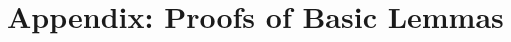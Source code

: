 \documentclass{article}
\newcommand{\tth}{\theta}
\newcommand{\bb}[1]{\mathbf{#1}}
\newcommand{\fl}{\mathrm{fl}}
\theoremstyle{definition}
\begin{document}
%
%
%

\appendix
\section{Appendix: Proofs of Basic Lemmas}
\label{appendix:A}


\clearpage


	
\end{document}
